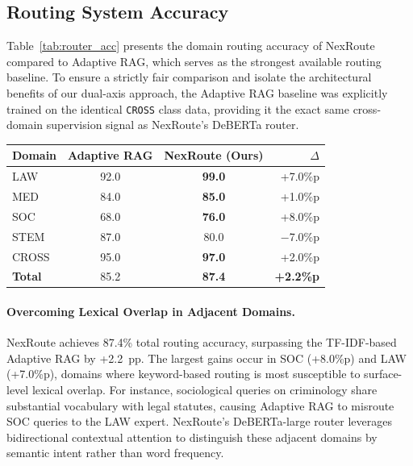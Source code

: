 \documentclass[a4paper,fleql]{cas-sc}
\begin{document}
\subsection{Routing System Accuracy}
\label{ssec:router}
Table~\ref{tab:router_acc} presents the domain routing accuracy of NexRoute
compared to Adaptive RAG, which serves as the strongest available routing
baseline. To ensure a strictly fair comparison and isolate the architectural
benefits of our dual-axis approach, the Adaptive RAG baseline was explicitly
trained on the identical \texttt{CROSS} class data, providing it the exact
same cross-domain supervision signal as NexRoute's DeBERTa router.

\vspace{6pt plus 4pt minus 3pt}
\begin{center}
\begingroup
{}
\label{tab:router_acc}
\begin{tabular}{lccr}
\toprule
\textbf{Domain} & \textbf{Adaptive RAG} & \textbf{NexRoute (Ours)} & \textbf{$\Delta$} \\
\midrule
LAW              & 92.0 & \textbf{99.0} & +7.0\%p \\
MED              & 84.0 & \textbf{85.0}  & +1.0\%p \\
SOC              & 68.0 & \textbf{76.0}  & +8.0\%p \\
STEM             & 87.0 & 80.0           & $-$7.0\%p \\
\midrule
CROSS            & 95.0 & \textbf{97.0}  & +2.0\%p \\
\midrule
\textbf{Total}   & 85.2 & \textbf{87.4}  & \textbf{+2.2\%p} \\
\bottomrule
\end{tabular}
\endgroup
\end{center}
\vspace{6pt plus 4pt minus 3pt}

\paragraph{Overcoming Lexical Overlap in Adjacent Domains.}
NexRoute achieves 87.4\% total routing accuracy, surpassing the TF-IDF-based
Adaptive RAG by +2.2~pp. The largest gains occur in SOC (+8.0\%p) and LAW
(+7.0\%p), domains where keyword-based routing is most susceptible to
surface-level lexical overlap. For instance, sociological queries on
criminology share substantial vocabulary with legal statutes, causing Adaptive
RAG to misroute SOC queries to the LAW expert. NexRoute's DeBERTa-large
router leverages bidirectional contextual attention to distinguish these
adjacent domains by semantic intent rather than word frequency.
\end{document}
